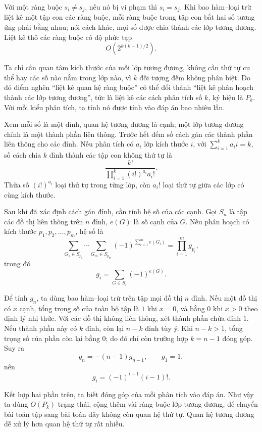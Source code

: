 \documentclass[11pt]{article}
\begin{document}
Với một ràng buộc \(s_i\ne s_j\), nếu nó bị vi phạm thì \(s_i=s_j\). Khi bao
hàm--loại trừ liệt kê một tập con các ràng buộc, mỗi ràng buộc trong tập con
bắt hai số tương ứng phải bằng nhau; nói cách khác, mọi số được chia thành các
lớp tương đương. Liệt kê thô các ràng buộc có độ phức tạp
\[
  O\left(2^{k(k-1)/2}\right).
\]

Ta chỉ cần quan tâm kích thước của mỗi lớp tương đương, không cần thứ tự cụ thể
hay các số nào nằm trong lớp nào, vì \(k\) đối tượng đếm không phân biệt. Do đó
điểm nghẽn ``liệt kê quan hệ ràng buộc'' có thể đổi thành ``liệt kê phân hoạch
thành các lớp tương đương'', tức là liệt kê các cách phân tích số \(k\), ký
hiệu là \(P_k\). Với mỗi kiểu phân tích, ta tính nó được tính vào đáp án bao
nhiêu lần.

Xem mỗi số là một đỉnh, quan hệ tương đương là cạnh; một lớp tương đương chính
là một thành phần liên thông. Trước hết đếm số cách gán các thành phần liên
thông cho các đỉnh. Nếu phân tích có \(a_i\) lớp kích thước \(i\), với
\(\sum_{i=1}^{k}a_i i=k\), số cách chia \(k\) đỉnh thành các tập con không thứ
tự là
\[
  \frac{k!}{\prod_{i=1}^{k}(i!)^{a_i}a_i!}.
\]
Thừa số \((i!)^{a_i}\) loại thứ tự trong từng lớp, còn \(a_i!\) loại thứ tự
giữa các lớp có cùng kích thước.

Sau khi đã xác định cách gán đỉnh, cần tính hệ số của các cạnh. Gọi \(S_n\) là
tập các đồ thị liên thông trên \(n\) đỉnh, \(e(G)\) là số cạnh của \(G\). Nếu
phân hoạch có kích thước \(p_1,p_2,\ldots,p_m\), hệ số là
\[
  \sum_{G_1\in S_{p_1}}\cdots\sum_{G_m\in S_{p_m}}
  (-1)^{\sum_{i=1}^{m}e(G_i)}
  =\prod_{i=1}^{m}g_{p_i},
\]
trong đó
\[
  g_i=\sum_{G\in S_i}(-1)^{e(G)}.
\]

Để tính \(g_n\), ta dùng bao hàm--loại trừ trên tập mọi đồ thị \(n\) đỉnh. Nếu
một đồ thị có \(x\) cạnh, tổng trọng số của toàn bộ tập là \(1\) khi \(x=0\),
và bằng \(0\) khi \(x>0\) theo định lý nhị thức. Với các đồ thị không liên
thông, xét thành phần chứa đỉnh \(1\). Nếu thành phần này có \(k\) đỉnh, còn
lại \(n-k\) đỉnh tùy ý. Khi \(n-k>1\), tổng trọng số của phần còn lại bằng
\(0\); do đó chỉ còn trường hợp \(k=n-1\) đóng góp. Suy ra
\[
  g_n=-(n-1)g_{n-1},\qquad g_1=1,
\]
nên
\[
  g_i=(-1)^{i-1}(i-1)!.
\]

Kết hợp hai phần trên, ta biết đóng góp của mỗi phân tích vào đáp án. Như vậy
ta dùng \(O(P_k)\) trạng thái, cộng thêm vài ràng buộc lớp tương đương, để
chuyển bài toán tập sang bài toán dãy không còn quan hệ thứ tự. Quan hệ tương
đương dễ xử lý hơn quan hệ thứ tự rất nhiều.
\end{document}
